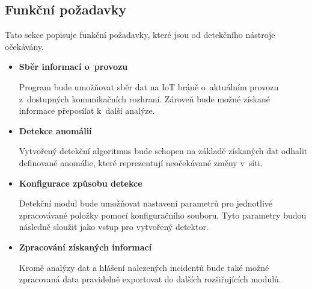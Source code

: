   \subsection{Funkční požadavky}
  Tato sekce popisuje funkční požadavky, které jsou od detekčního nástroje očekávány.
  \begin{itemize}
   \item \textbf{Sběr informací o~provozu}
   
   Program bude umožňovat sběr dat na IoT bráně o~aktuálním provozu z~dostupných komunikačních
   rozhraní. Zároveň bude možné získané informace přeposílat k~další analýze.
   
   \item \textbf{Detekce anomálií}
   
   Vytvořený detekční algoritmus bude schopen na základě získaných dat odhalit definované anomálie,
   které reprezentují neočekávané změny v~síti. 
   
   \item \textbf{Konfigurace způsobu detekce}
   
   Detekční modul bude umožňovat nastavení parametrů pro jednotlivé zpracovávané položky
   pomocí konfiguračního souboru. Tyto 
   parametry budou následně sloužit jako vstup pro vytvořený detektor.
   
   \item \textbf{Zpracování získaných informací}
   
   Kromě analýzy dat a hlášení nalezených incidentů bude také možné zpracovaná data pravidelně 
   exportovat do dalších rozšiřujících modulů.
  \end{itemize}

